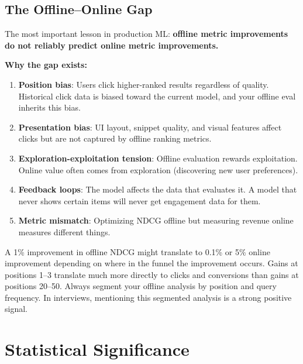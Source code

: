 \subsection{The Offline--Online Gap}

The most important lesson in production ML: \textbf{offline metric improvements do not reliably predict online metric improvements.}

\textbf{Why the gap exists:}
\begin{enumerate}
    \item \textbf{Position bias}: Users click higher-ranked results regardless of quality. Historical click data is biased toward the current model, and your offline eval inherits this bias.
    \item \textbf{Presentation bias}: UI layout, snippet quality, and visual features affect clicks but are not captured by offline ranking metrics.
    \item \textbf{Exploration-exploitation tension}: Offline evaluation rewards exploitation. Online value often comes from exploration (discovering new user preferences).
    \item \textbf{Feedback loops}: The model affects the data that evaluates it. A model that never shows certain items will never get engagement data for them.
    \item \textbf{Metric mismatch}: Optimizing NDCG offline but measuring revenue online measures different things.
\end{enumerate}

\begin{keyinsight}
A 1\% improvement in offline NDCG might translate to 0.1\% or 5\% online improvement depending on where in the funnel the improvement occurs. Gains at positions 1--3 translate much more directly to clicks and conversions than gains at positions 20--50. Always segment your offline analysis by position and query frequency. In interviews, mentioning this segmented analysis is a strong positive signal.
\end{keyinsight}

\section{Statistical Significance}
\label{sec:statistical_significance}

